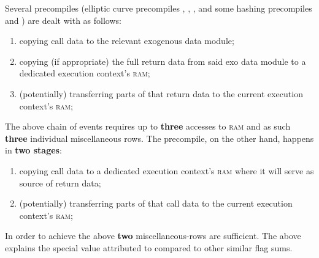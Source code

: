\saNote{}
Several precompiles (elliptic curve precompiles , , , 
and some hashing precompiles  and )
are dealt with as follows:
\begin{enumerate}
	\item copying call data to the relevant exogenous data module;
	\item copying (if appropriate) the full return data from said exo data module to a dedicated execution context's \textsc{ram};
	\item (potentially) transferring parts of that return data to the current execution context's \textsc{ram};
\end{enumerate}
The above chain of events requires up to \textbf{three} accesses to \textsc{ram} and as such \textbf{three} individual miscellaneous rows.
The  precompile, on the other hand, happens in \textbf{two stages}:
\begin{enumerate}
	\item copying call data to a dedicated execution context's \textsc{ram} where it will serve as source of return data;
	\item (potentially) transferring parts of that call data to the current execution context's \textsc{ram};
\end{enumerate}
In order to achieve the above \textbf{two} miscellaneous-rows are sufficient.
The above explains the special value attributed to \locFlagSumIdentitySuccess{} compared to other similar flag sums.
